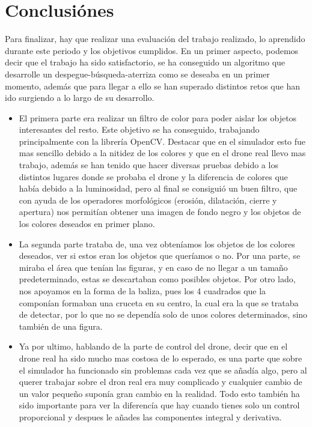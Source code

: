 \chapter{Conclusi\'ones}\label{cap.conclusiones}

\hspace{1cm} Para finalizar, hay que realizar una evaluaci\'on del trabajo realizado, lo aprendido durante este periodo y los objetivos cumplidos. En un primer aspecto, podemos decir que el trabajo ha sido satisfactorio, se ha conseguido un algoritmo que desarrolle un despegue-b\'usqueda-aterriza como se deseaba en un primer momento, adem\'as que para llegar a ello se han superado distintos retos que han ido surgiendo a lo largo de su desarrollo.

\begin{itemize}
	\item El primera parte era realizar un filtro de color para poder aislar los objetos interesantes del resto. Este objetivo se ha conseguido, trabajando principalmente con la librer\'ia OpenCV. Destacar que en el simulador esto fue mas sencillo debido a la nitidez de los colores y que en el drone real llevo mas trabajo, adem\'as se han tenido que hacer diversas pruebas debido a los distintos lugares donde se probaba el drone y la diferencia de colores que hab\'ia debido a la luminosidad, pero al final se consigui\'o un buen filtro, que con ayuda de los operadores morfol\'ogicos (erosi\'on, dilataci\'on, cierre y apertura) nos permit\'ian obtener una imagen de fondo negro y los objetos de los colores deseados en primer plano.

	\item La segunda parte trataba de, una vez obten\'iamos los objetos de los colores deseados, ver si estos eran los objetos que quer\'iamos o no. Por una parte, se miraba el \'area que ten\'ian las figuras, y en caso de no llegar a un tamaño predeterminado, estas se descartaban como posibles objetos. Por otro lado, nos apoyamos en la forma de la baliza, pues los 4 cuadrados que la compon\'ian formaban una cruceta en su centro, la cual era la que se trataba de detectar, por lo que no se depend\'ia solo de unos colores determinados, sino tambi\'en de una figura. 
	
	\item Ya por ultimo, hablando de la parte de control del drone, decir que en el drone real ha sido mucho mas costosa de lo esperado, es una parte que sobre el simulador ha funcionado sin problemas cada vez que se añad\'ia algo, pero al querer trabajar sobre el dron real era muy complicado y cualquier cambio de un valor pequeño supon\'ia gran cambio en la realidad. Todo esto tambi\'en ha sido importante para ver la diferenc\'ia que hay cuando tienes solo un control proporcional y despues le añades las componentes integral y derivativa. 
	
\end{itemize}

